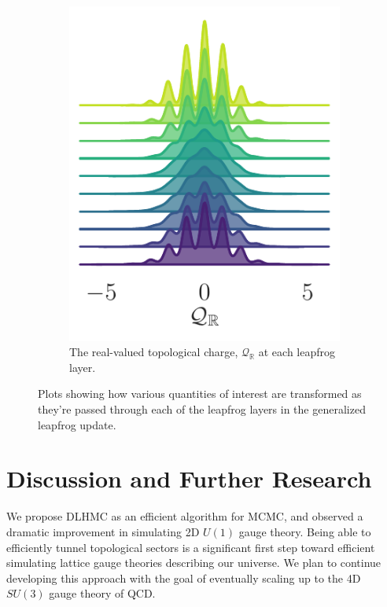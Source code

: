 \documentclass{article} %
\begin{document}
\begin{figure}[hbpt]
\begin{subfigure}[t]{0.315\textwidth}
      \includegraphics[width=\textwidth]{figures/ridgeplots/sinQf.pdf}
      \caption{\label{fig:sinQf}The real-valued topological charge, \(\mathcal{Q}_{\mathbb{R}}\) at each
      leapfrog layer.}%
   \end{subfigure}
   \caption{Plots showing how various quantities of interest are transformed as they're passed through each of the
   leapfrog layers in the generalized leapfrog update.}
\end{figure}
%
\section{Discussion and Further Research}
We propose DLHMC as an efficient algorithm for MCMC, and observed a dramatic improvement in simulating 2D $U(1)$ gauge
theory.
%
Being able to efficiently tunnel topological sectors is a significant first step toward efficient simulating lattice
gauge theories describing our universe.
%
We plan to continue developing this approach with the goal of eventually scaling up to the 4D \(SU(3)\) gauge theory of
QCD.\@
%
\end{document}
